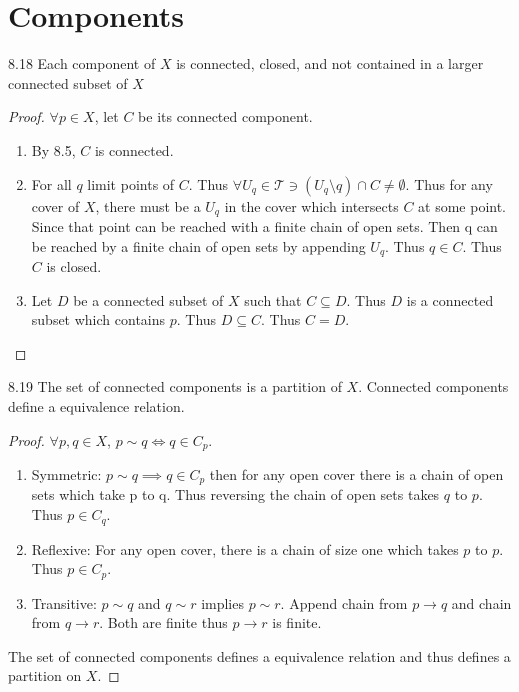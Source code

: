 \documentclass{article}
\newcommand*{\T}{\mathcal{T}}
\newcommand*{\empset}{\emptyset}
\begin{document}
\pagebreak

\section{Components}
\begin{claim}{8.18}\label{Claim 8.18.}
    Each component of $X$ is connected, closed, and not contained in a larger connected subset of $X$  
\end{claim}
\begin{proof}
    $\forall p \in X$, let $C$ be its connected component.     
    \begin{enumerate}
        \item By 8.5, $C$ is connected. 
        \item For all $q$ limit points of $C$. Thus $\forall U_q \in \T \ni (U_q \setminus q) \cap C \neq \empset$. Thus for any cover of $X$, there must be a $U_q$ in the cover which intersects $C$ at some point. Since that point can be reached with a finite chain of open sets. Then q can be reached by a finite chain of open sets by appending $U_q$. Thus $q \in C$. Thus $C$ is closed.            
        \item Let $D$ be a connected subset of $X$ such that $C \subseteq D$. Thus $D$ is a connected subset which contains $p$. Thus $D \subseteq C$. Thus $C = D.$          
    \end{enumerate}
    
\end{proof}

\bigskip

\begin{claim}{8.19}\label{Claim 8.19.}
    The set of connected components is a partition of $X$. Connected components define a equivalence relation. 
\end{claim}
\begin{proof}
    $\forall p , q \in X$, $p \sim q \iff q \in C_p$. 
    
    \begin{enumerate}
        \item Symmetric: $p \sim q \implies q \in C_p$ then for any open cover there is a chain of open sets which take p to q. Thus reversing the chain of open sets takes $q$ to $p$. Thus $p \in C_q$. 
        \item Reflexive: For any open cover, there is a chain of size one which takes $p$ to $p$. Thus $p \in C_p$. 
        \item Transitive: $p \sim q$ and $q \sim r$ implies $p \sim r$. Append chain from $p \to q$ and chain from $q \to r$. Both are finite thus $p \to r$ is finite.       
    \end{enumerate}

    The set of connected components defines a equivalence relation and thus defines a partition on $X$. 
\end{proof}
\end{document}
